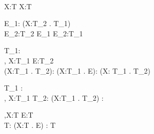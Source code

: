  {\vdash\Gamma \\ X:T \in \Gamma} {\Gamma\vdash X:T }

 {\Gamma\vdash E_1: (\Pi X:T_2 . T_1)  \\
  \Gamma\vdash E_2:T_2 } {\Gamma\vdash E_1 E_2:T_1 
  }

 {\Gamma\vdash T_1:\star {} \\
  \Gamma, X:T_1  \vdash E:T_2  \\
  \Gamma\vdash(\Pi X:T_1 . T_2):\star} {\Gamma\vdash(\lambda X:T_1 . E): (\Pi X:
  T_1 . T_2) }

 {\Gamma \vdash T_1 : \star {} \\
  \Gamma, X:T_1  \vdash T_2:\star {}} {\Gamma \vdash (\Pi X:T_1 . T_2) :
  \star {}}

 {\Gamma,X:T  \vdash E:T  \\ \Gamma \vdash
  T:\star {}} {\Gamma\vdash(\mu X:T . E) : T }






